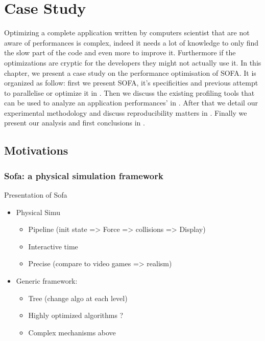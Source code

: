 \chapter{Case Study}
\label{chap:perf}


Optimizing a complete application written by computers scientist that are not
aware of performances is complex, indeed it needs a lot of knowledge to only
find the slow part of the code and even more to improve it. Furthermore if the
optimizations are cryptic for the developers they might not actually use it.
In this chapter, we present a case study on the performance optimisation of
\gls{SOFA}. It is organized as follow: first we present \gls{SOFA}, it's
specificities and previous attempt to parallelise or optimize it in
. Then we discuss the existing profiling tools that can
be used to analyze an application performances' in . After
that we detail our experimental methodology and discuss reproducibility
matters in . Finally we present our analysis and first
conclusions in .

\section{Motivations}
\label{sec:motivations}

\subsection{Sofa: a physical simulation framework}


Presentation of Sofa
\begin{itemize}
    \item Physical Simu
        \begin{itemize}
            \item Pipeline (init state => Force => collisions => Display)
            \item Interactive time
            \item Precise (compare to video games => realism)
        \end{itemize}
    \item Generic framework:
        \begin{itemize}
            \item Tree (change algo at each level)
            \item Highly optimized algorithms ?
            \item Complex mechanisms above
        \end{itemize}
\end{itemize}

